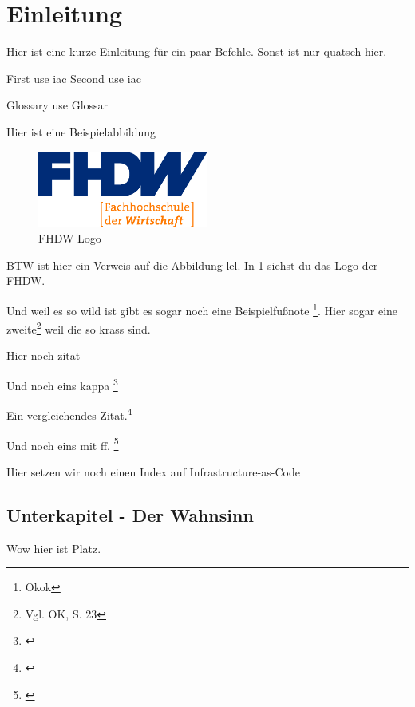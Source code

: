 
\section{Einleitung}
\label{sec:einleitung}

Hier ist eine kurze Einleitung für ein paar Befehle. Sonst ist nur quatsch hier.

First use \gls{iac}
Second use \gls{iac}

Glossary use \gls{Glossar}


Hier ist eine Beispielabbildung
\begin{figure}[hbt]
    \begin{minipage}{1\textwidth}

    \centering
    \includegraphics[width=0.5\textwidth]{abbildungen/fhdw}
    \caption{FHDW Logo}
    \label{fig:fhdw-logo}
    \end{minipage}
\end{figure}

BTW ist hier ein Verweis auf die Abbildung lel. In \cref{fig:fhdw-logo} siehst du das Logo der FHDW.

Und weil es so wild ist gibt es sogar noch eine Beispielfußnote \footnote{Okok}.
Hier sogar eine zweite\footnote{Vgl. OK, S. 23} weil die so krass sind.

Hier noch zitat \cite[Vgl.][]{ozel_infrastructure_2020}

Und noch eins kappa \footnote{\cite[13\psq]{rahman_as_2020}}

Ein vergleichendes Zitat.\footnote{\cite[vgl.][5\psqq]{rahman_as_2020}}

Und noch eins mit ff. \footnote{\cite[23\psqq]{rahman_as_2020}}

Hier setzen wir noch einen Index auf Infrastructure-as-Code 


\subsection{Unterkapitel - Der Wahnsinn}

Wow hier ist Platz.
